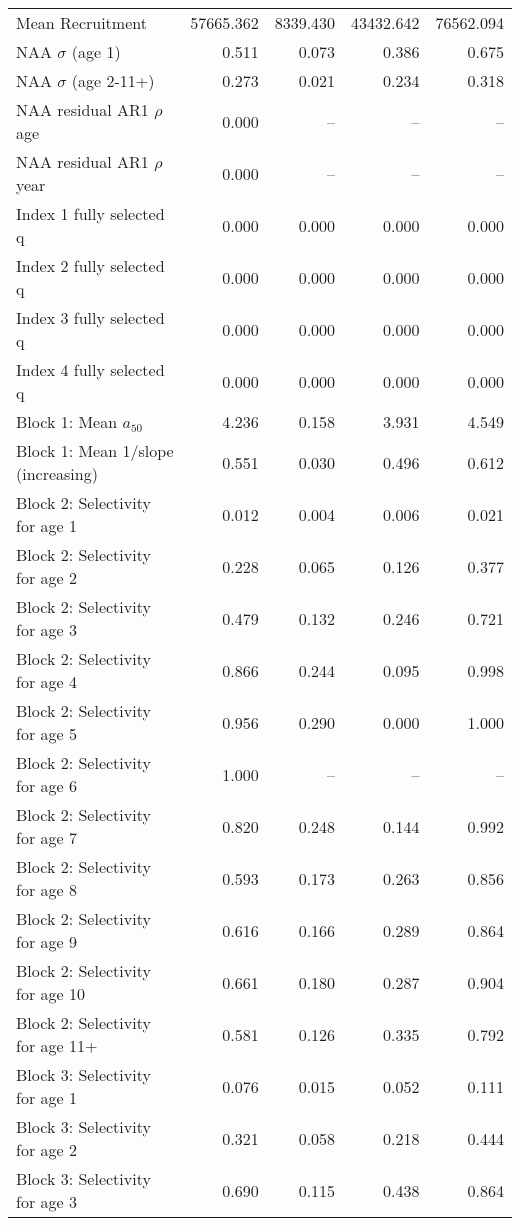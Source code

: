\documentclass[
]{article}
\begin{document}
\begin{landscape}
\begin{longtable}[t]{lrrrr}
\endfoot
\bottomrule
\endlastfoot
Mean Recruitment & 57665.362 & 8339.430 & 43432.642 & 76562.094\\
NAA $\sigma$ (age 1) & 0.511 & 0.073 & 0.386 & 0.675\\
NAA $\sigma$ (age 2-11+) & 0.273 & 0.021 & 0.234 & 0.318\\
NAA residual AR1 $\rho$ age & 0.000 & -- & -- & --\\
NAA residual AR1 $\rho$ year & 0.000 & -- & -- & --\\
\addlinespace
Index 1 fully selected q & 0.000 & 0.000 & 0.000 & 0.000\\
Index 2 fully selected q & 0.000 & 0.000 & 0.000 & 0.000\\
Index 3 fully selected q & 0.000 & 0.000 & 0.000 & 0.000\\
Index 4 fully selected q & 0.000 & 0.000 & 0.000 & 0.000\\
Block 1: Mean $a_{50}$ & 4.236 & 0.158 & 3.931 & 4.549\\
\addlinespace
Block 1: Mean 1/slope (increasing) & 0.551 & 0.030 & 0.496 & 0.612\\
Block 2: Selectivity for age 1 & 0.012 & 0.004 & 0.006 & 0.021\\
Block 2: Selectivity for age 2 & 0.228 & 0.065 & 0.126 & 0.377\\
Block 2: Selectivity for age 3 & 0.479 & 0.132 & 0.246 & 0.721\\
Block 2: Selectivity for age 4 & 0.866 & 0.244 & 0.095 & 0.998\\
\addlinespace
Block 2: Selectivity for age 5 & 0.956 & 0.290 & 0.000 & 1.000\\
Block 2: Selectivity for age 6 & 1.000 & -- & -- & --\\
Block 2: Selectivity for age 7 & 0.820 & 0.248 & 0.144 & 0.992\\
Block 2: Selectivity for age 8 & 0.593 & 0.173 & 0.263 & 0.856\\
Block 2: Selectivity for age 9 & 0.616 & 0.166 & 0.289 & 0.864\\
\addlinespace
Block 2: Selectivity for age 10 & 0.661 & 0.180 & 0.287 & 0.904\\
Block 2: Selectivity for age 11+ & 0.581 & 0.126 & 0.335 & 0.792\\
Block 3: Selectivity for age 1 & 0.076 & 0.015 & 0.052 & 0.111\\
Block 3: Selectivity for age 2 & 0.321 & 0.058 & 0.218 & 0.444\\
Block 3: Selectivity for age 3 & 0.690 & 0.115 & 0.438 & 0.864\\

\end{longtable}
\end{landscape}
\end{document}
